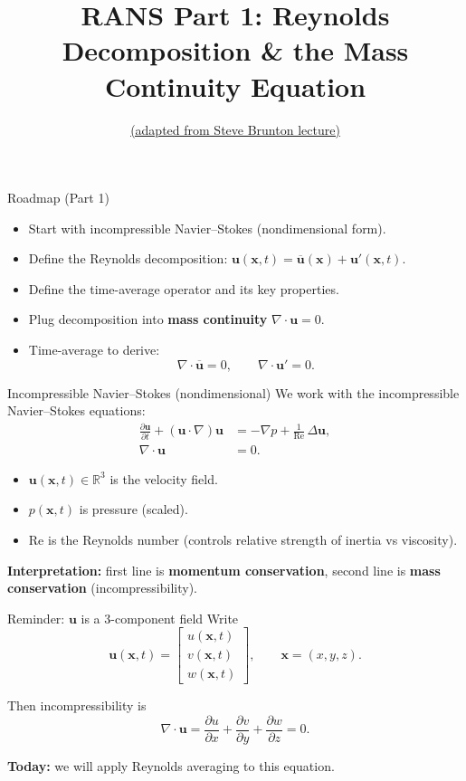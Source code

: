 \documentclass[aspectratio=169]{beamer}
\title[RANS I: Continuity]{RANS Part 1: Reynolds Decomposition \& the Mass Continuity Equation}
\author{\href{https://www.youtube.com/watch?v=mDt-HJEXK6g}{(adapted from Steve Brunton lecture)}}
\date{}
\newcommand{\uu}{\bm{u}}
\newcommand{\x}{\bm{x}}
\newcommand{\pp}{p}
\newcommand{\Rey}{\mathrm{Re}}
\newcommand{\avg}[1]{\overline{#1}}
\newcommand{\up}{\uu'}
\newcommand{\ubar}{\avg{\uu}}
\begin{document}
\begin{frame}
  \titlepage
\end{frame}

\begin{frame}{Roadmap (Part 1)}
\begin{itemize}
  \item Start with incompressible Navier--Stokes (nondimensional form).
  \item Define the Reynolds decomposition: $\uu(\x,t)=\ubar(\x)+\up(\x,t)$.
  \item Define the time-average operator and its key properties.
  \item Plug decomposition into \textbf{mass continuity} $\nabla\cdot\uu=0$.
  \item Time-average to derive:
  \[
    \nabla\cdot\ubar = 0,
    \qquad
    \nabla\cdot\up = 0.
  \]
\end{itemize}
\end{frame}

\begin{frame}{Incompressible Navier--Stokes (nondimensional)}
We work with the incompressible Navier--Stokes equations:
\begin{align*}
\frac{\partial \uu}{\partial t} + (\uu\cdot\nabla)\uu &= -\nabla \pp + \frac{1}{\Rey}\,\Delta \uu,\\
\nabla\cdot\uu &= 0.
\end{align*}

\begin{itemize}
  \item $\uu(\x,t)\in\mathbb{R}^3$ is the velocity field.
  \item $\pp(\x,t)$ is pressure (scaled).
  \item $\Rey$ is the Reynolds number (controls relative strength of inertia vs viscosity).
\end{itemize}

\textbf{Interpretation:} first line is  \textbf{momentum conservation}, second line is \textbf{mass conservation} (incompressibility).
\end{frame}

\begin{frame}{Reminder: $\uu$ is a 3-component field}
Write
\[
\uu(\x,t) =
\begin{bmatrix}
u(\x,t)\\
v(\x,t)\\
w(\x,t)
\end{bmatrix},
\qquad
\x=(x,y,z).
\]

Then incompressibility is
\[
\nabla\cdot\uu = \frac{\partial u}{\partial x} + \frac{\partial v}{\partial y} + \frac{\partial w}{\partial z} = 0.
\]

\textbf{Today:} we will apply Reynolds averaging to this equation.
\end{frame}
\end{document}
